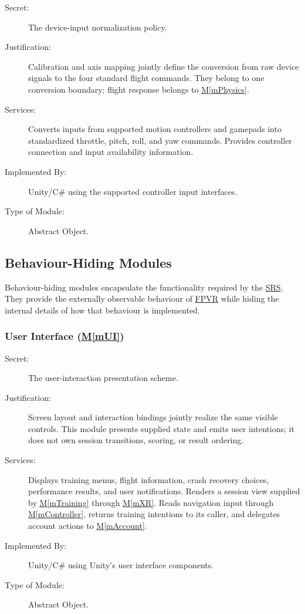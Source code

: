 \documentclass[12pt, titlepage]{article}
\DeclareRobustCommand{\mgabbr}[2]{\hyperlink{mg-abbr:#1}{#2}}
\newcommand{\mref}[1]{\hyperref[#1]{M\ref*{#1}}}
\begin{document}
\begin{description}

\item[Secret:]
The device-input normalization policy.

\item[Justification:]
Calibration and axis mapping jointly define the conversion from raw device
signals to the four standard flight commands. They belong to one conversion
boundary; flight response belongs to \mref{mPhysics}.

\item[Services:]
Converts inputs from supported motion controllers and
gamepads into standardized throttle, pitch, roll, and yaw
commands. Provides controller connection and input
availability information.

\item[Implemented By:]
Unity/C\# using the supported controller input interfaces.

\item[Type of Module:]
Abstract Object.

\end{description}


\subsection{Behaviour-Hiding Modules}

Behaviour-hiding modules encapsulate the functionality
required by the \mgabbr{srs}{SRS}. They provide the externally observable
behaviour of \mgabbr{fpvr}{FPVR} while hiding the internal details of
how that behaviour is implemented.


\subsubsection{User Interface (\mref{mUI})}

\begin{description}

\item[Secret:]
The user-interaction presentation scheme.

\item[Justification:]
Screen layout and interaction bindings jointly realize the same visible
controls. This module presents supplied state and emits user intentions;
it does not own session transitions, scoring, or result ordering.

\item[Services:]
Displays training menus, flight information, crash recovery
choices, performance results, and user notifications.
Renders a session view supplied by \mref{mTraining} through
\mref{mXR}. Reads navigation input through \mref{mController}, returns
training intentions to its caller, and delegates account actions to
\mref{mAccount}.

\item[Implemented By:]
Unity/C\# using Unity's user interface components.

\item[Type of Module:]
Abstract Object.

\end{description}
\end{document}
